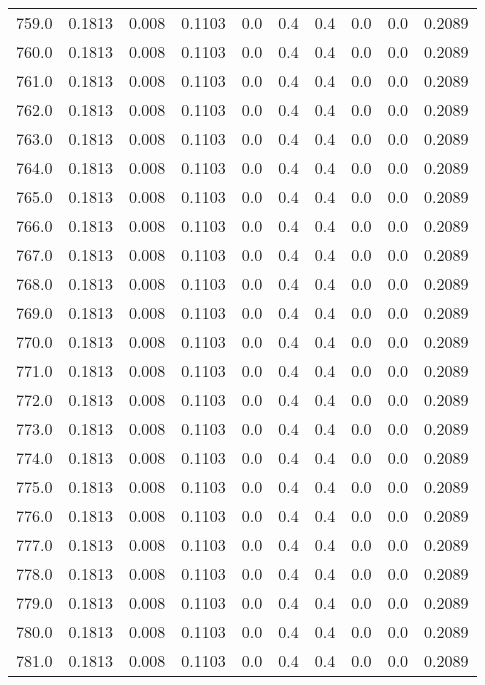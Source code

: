 \begin{longtable}{lrrrrrrrrr}
759.0 & 0.1813 & 0.008 & 0.1103 & 0.0 & 0.4 & 0.4 & 0.0 & 0.0 & 0.2089 \\
760.0 & 0.1813 & 0.008 & 0.1103 & 0.0 & 0.4 & 0.4 & 0.0 & 0.0 & 0.2089 \\
761.0 & 0.1813 & 0.008 & 0.1103 & 0.0 & 0.4 & 0.4 & 0.0 & 0.0 & 0.2089 \\
762.0 & 0.1813 & 0.008 & 0.1103 & 0.0 & 0.4 & 0.4 & 0.0 & 0.0 & 0.2089 \\
763.0 & 0.1813 & 0.008 & 0.1103 & 0.0 & 0.4 & 0.4 & 0.0 & 0.0 & 0.2089 \\
764.0 & 0.1813 & 0.008 & 0.1103 & 0.0 & 0.4 & 0.4 & 0.0 & 0.0 & 0.2089 \\
765.0 & 0.1813 & 0.008 & 0.1103 & 0.0 & 0.4 & 0.4 & 0.0 & 0.0 & 0.2089 \\
766.0 & 0.1813 & 0.008 & 0.1103 & 0.0 & 0.4 & 0.4 & 0.0 & 0.0 & 0.2089 \\
767.0 & 0.1813 & 0.008 & 0.1103 & 0.0 & 0.4 & 0.4 & 0.0 & 0.0 & 0.2089 \\
768.0 & 0.1813 & 0.008 & 0.1103 & 0.0 & 0.4 & 0.4 & 0.0 & 0.0 & 0.2089 \\
769.0 & 0.1813 & 0.008 & 0.1103 & 0.0 & 0.4 & 0.4 & 0.0 & 0.0 & 0.2089 \\
770.0 & 0.1813 & 0.008 & 0.1103 & 0.0 & 0.4 & 0.4 & 0.0 & 0.0 & 0.2089 \\
771.0 & 0.1813 & 0.008 & 0.1103 & 0.0 & 0.4 & 0.4 & 0.0 & 0.0 & 0.2089 \\
772.0 & 0.1813 & 0.008 & 0.1103 & 0.0 & 0.4 & 0.4 & 0.0 & 0.0 & 0.2089 \\
773.0 & 0.1813 & 0.008 & 0.1103 & 0.0 & 0.4 & 0.4 & 0.0 & 0.0 & 0.2089 \\
774.0 & 0.1813 & 0.008 & 0.1103 & 0.0 & 0.4 & 0.4 & 0.0 & 0.0 & 0.2089 \\
775.0 & 0.1813 & 0.008 & 0.1103 & 0.0 & 0.4 & 0.4 & 0.0 & 0.0 & 0.2089 \\
776.0 & 0.1813 & 0.008 & 0.1103 & 0.0 & 0.4 & 0.4 & 0.0 & 0.0 & 0.2089 \\
777.0 & 0.1813 & 0.008 & 0.1103 & 0.0 & 0.4 & 0.4 & 0.0 & 0.0 & 0.2089 \\
778.0 & 0.1813 & 0.008 & 0.1103 & 0.0 & 0.4 & 0.4 & 0.0 & 0.0 & 0.2089 \\
779.0 & 0.1813 & 0.008 & 0.1103 & 0.0 & 0.4 & 0.4 & 0.0 & 0.0 & 0.2089 \\
780.0 & 0.1813 & 0.008 & 0.1103 & 0.0 & 0.4 & 0.4 & 0.0 & 0.0 & 0.2089 \\
781.0 & 0.1813 & 0.008 & 0.1103 & 0.0 & 0.4 & 0.4 & 0.0 & 0.0 & 0.2089 \\

\end{longtable}
